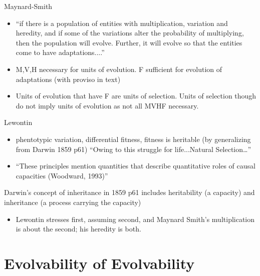 	Maynard-Smith
	\begin{itemize}
		\item
		
		``if there is a population of entities with multiplication,
		variation and heredity, and if some of the variations alter the
		probability of multiplying, then the population will evolve.
		Further, it will evolve so that the entities come to have
		adaptations....''
		
		\item
		
		M,V,H necessary for units of evolution. F sufficient for evolution
		of adaptations (with proviso in text)
		
		\item
		
		Units of evolution that have F are units of selection. Units of
		selection though do not imply units of evolution as not all MVHF
		necessary.
		
	\end{itemize}
	
	Lewontin
	\begin{itemize}
		\item
		
		phentotypic variation, differential fitness, fitness is heritable
		(by generalizing from Darwin 1859 p61) ``Owing to this struggle for
		life...Natural Selection\ldots{}''
		
		\item
		
		``These principles mention quantities that describe quantitative
		roles of causal capacities (Woodward, 1993)''
		
	\end{itemize}
	
	Darwin's concept of inheritance in 1859 p61 includes heritability (a
	capacity) and inheritance (a process carrying the capacity)
	
	\begin{itemize}
		\item	
		Lewontin stresses first, assuming second, and Maynard Smith's
		multiplication is about the second; his heredity is both.
		
	\end{itemize}

\section{Evolvability of Evolvability}


